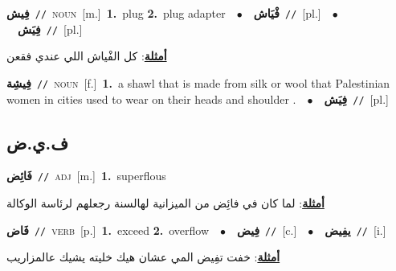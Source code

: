 \documentclass[10pt,a4paper,twoside]{article} %
\begin{document}
\begin{multicols}{2}
{\setlength\topsep{0pt}\textbf{\foreignlanguage{arabic}{فِيش}}\ {\color{gray}\texttt{//}\color{black}}\ \textsc{noun}\ [m.]\ \textbf{1.}~plug  \textbf{2.}~plug adapter\ \ $\bullet$\ \ \setlength\topsep{0pt}\textbf{\foreignlanguage{arabic}{فْيَاش}}\ {\color{gray}\texttt{//}\color{black}}\ [pl.]\ \ $\bullet$\ \ \setlength\topsep{0pt}\textbf{\foreignlanguage{arabic}{فِيَش}}\ {\color{gray}\texttt{//}\color{black}}\ [pl.]\  \begin{flushright}\color{gray}\foreignlanguage{arabic}{\textbf{\underline{\foreignlanguage{arabic}{أمثلة}}}: كل الفْياش اللي عندي فقعن}\end{flushright}\color{black}} \vspace{2mm}

{\setlength\topsep{0pt}\textbf{\foreignlanguage{arabic}{فِيشِة}}\ {\color{gray}\texttt{//}\color{black}}\ \textsc{noun}\ [f.]\ \textbf{1.}~a shawl that is made from silk or wool that Palestinian women in cities used to wear on their heads and shoulder .\ \ $\bullet$\ \ \setlength\topsep{0pt}\textbf{\foreignlanguage{arabic}{فِيَش}}\ {\color{gray}\texttt{//}\color{black}}\ [pl.]\ } \vspace{2mm}

\vspace{-3mm}
\subsection*{\color{blue}\foreignlanguage{arabic}{ف.ي.ض}\color{blue}{}} 

{\setlength\topsep{0pt}\textbf{\foreignlanguage{arabic}{فَائِض}}\ {\color{gray}\texttt{//}\color{black}}\ \textsc{adj}\ [m.]\ \textbf{1.}~superflous\  \begin{flushright}\color{gray}\foreignlanguage{arabic}{\textbf{\underline{\foreignlanguage{arabic}{أمثلة}}}: لما كان في فائِض من الميزانية لهالسنة رجعلهم لرئاسة الوكالة}\end{flushright}\color{black}} \vspace{2mm}

{\setlength\topsep{0pt}\textbf{\foreignlanguage{arabic}{فَاض}}\ {\color{gray}\texttt{//}\color{black}}\ \textsc{verb}\ [p.]\ \textbf{1.}~exceed  \textbf{2.}~overflow\ \ $\bullet$\ \ \setlength\topsep{0pt}\textbf{\foreignlanguage{arabic}{فِيض}}\ {\color{gray}\texttt{//}\color{black}}\ [c.]\ \ $\bullet$\ \ \setlength\topsep{0pt}\textbf{\foreignlanguage{arabic}{يفِيض}}\ {\color{gray}\texttt{//}\color{black}}\ [i.]\  \begin{flushright}\color{gray}\foreignlanguage{arabic}{\textbf{\underline{\foreignlanguage{arabic}{أمثلة}}}: خفت تفِيض المي عشان هيك خليته يشيك عالمزاريب}\end{flushright}\color{black}} \vspace{2mm}


\end{multicols}
\end{document}

